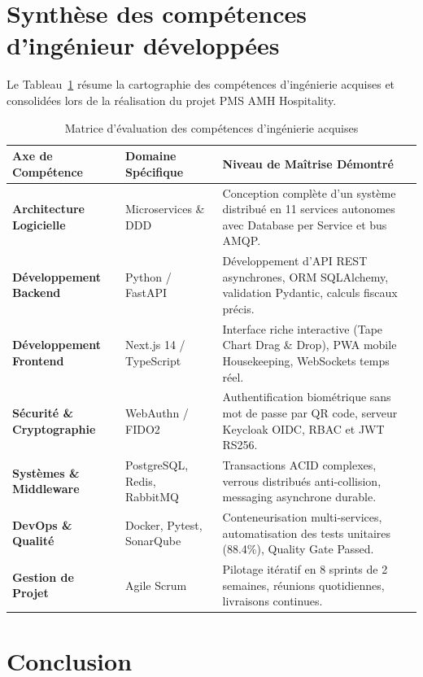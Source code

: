 \documentclass[12pt,a4paper,oneside]{report}
\begin{document}
\section{Synthèse des compétences d'ingénieur développées}

Le Tableau~\ref{tab:competences_synthese} résume la cartographie des compétences d'ingénierie acquises et consolidées lors de la réalisation du projet PMS AMH Hospitality.

\begin{table}[H]
\centering
\small
\renewcommand{\arraystretch}{1.3}
\begin{tabularx}{\textwidth}{|p{4cm}|p{3.5cm}|X|}
\hline
\textbf{Axe de Compétence} & \textbf{Domaine Spécifique} & \textbf{Niveau de Maîtrise Démontré} \\
\hline
\textbf{Architecture Logicielle} & Microservices \& DDD & Conception complète d'un système distribué en 11 services autonomes avec Database per Service et bus AMQP. \\
\hline
\textbf{Développement Backend} & Python / FastAPI & Développement d'API REST asynchrones, ORM SQLAlchemy, validation Pydantic, calculs fiscaux précis. \\
\hline
\textbf{Développement Frontend} & Next.js 14 / TypeScript & Interface riche interactive (Tape Chart Drag \& Drop), PWA mobile Housekeeping, WebSockets temps réel. \\
\hline
\textbf{Sécurité \& Cryptographie} & WebAuthn / FIDO2 & Authentification biométrique sans mot de passe par QR code, serveur Keycloak OIDC, RBAC et JWT RS256. \\
\hline
\textbf{Systèmes \& Middleware} & PostgreSQL, Redis, RabbitMQ & Transactions ACID complexes, verrous distribués anti-collision, messaging asynchrone durable. \\
\hline
\textbf{DevOps \& Qualité} & Docker, Pytest, SonarQube & Conteneurisation multi-services, automatisation des tests unitaires (88.4\%), Quality Gate Passed. \\
\hline
\textbf{Gestion de Projet} & Agile Scrum & Pilotage itératif en 8 sprints de 2 semaines, réunions quotidiennes, livraisons continues. \\
\hline
\end{tabularx}
\caption{Matrice d'évaluation des compétences d'ingénierie acquises}
\label{tab:competences_synthese}
\end{table}

\section{Conclusion}
\end{document}
